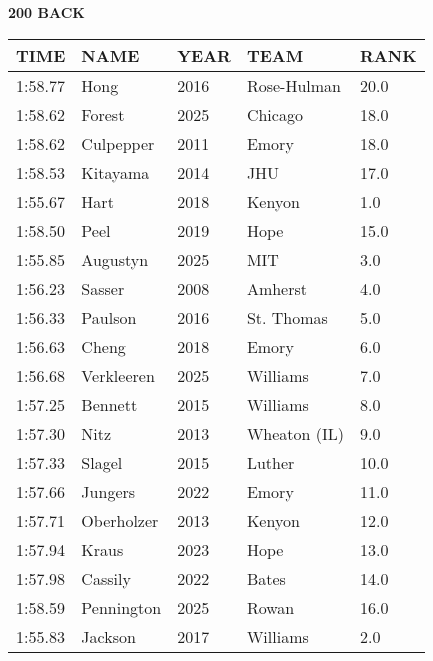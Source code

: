 \begin{minipage}[t]{0.48\textwidth}
\centering
\textbf{200 BACK}\\[0.05cm]
\begin{tabular}{@{}p{1.8cm}p{2.8cm}p{1.2cm}p{1.4cm}p{0.8cm}@{}}
\hline
\textbf{TIME} & \textbf{NAME} & \textbf{YEAR} & \textbf{TEAM} & \textbf{RANK} \\
\hline
1:58.77 & Hong & 2016 & Rose-Hulman & 20.0 \\
1:58.62 & Forest & 2025 & Chicago & 18.0 \\
1:58.62 & Culpepper & 2011 & Emory & 18.0 \\
1:58.53 & Kitayama & 2014 & JHU & 17.0 \\
1:55.67 & Hart & 2018 & Kenyon & 1.0 \\
1:58.50 & Peel & 2019 & Hope & 15.0 \\
1:55.85 & Augustyn & 2025 & MIT & 3.0 \\
1:56.23 & Sasser & 2008 & Amherst & 4.0 \\
1:56.33 & Paulson & 2016 & St. Thomas & 5.0 \\
1:56.63 & Cheng & 2018 & Emory & 6.0 \\
1:56.68 & Verkleeren & 2025 & Williams & 7.0 \\
1:57.25 & Bennett & 2015 & Williams & 8.0 \\
1:57.30 & Nitz & 2013 & Wheaton (IL) & 9.0 \\
1:57.33 & Slagel & 2015 & Luther & 10.0 \\
1:57.66 & Jungers & 2022 & Emory & 11.0 \\
1:57.71 & Oberholzer & 2013 & Kenyon & 12.0 \\
1:57.94 & Kraus & 2023 & Hope & 13.0 \\
1:57.98 & Cassily & 2022 & Bates & 14.0 \\
1:58.59 & Pennington & 2025 & Rowan & 16.0 \\
1:55.83 & Jackson & 2017 & Williams & 2.0 \\
\hline
\end{tabular}
\end{minipage}\hfill
